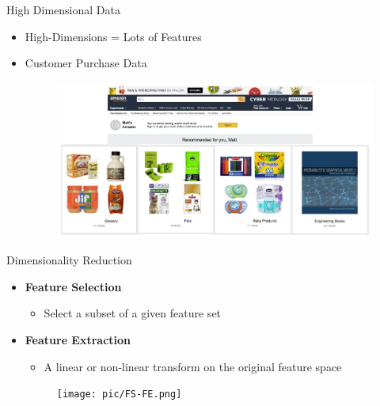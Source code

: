 \documentclass[serif, aspectratio=169]{beamer}
\begin{document}
\begin{frame}{High Dimensional Data}
    \begin{itemize}
        \item High-Dimensions  = Lots of	Features
        \item Customer Purchase Data
        \begin{figure}[htpb]
            \begin{center}
                \includegraphics[keepaspectratio, scale=0.4]{pic/customer_data.JPG}
            \end{center}
        \end{figure}
    \end{itemize}
\end{frame}


\begin{frame}{Dimensionality Reduction }
    \begin{itemize}
        \item \textbf{Feature Selection}
            \begin{itemize}
                \item Select a subset of a given feature set
            \end{itemize}

         \item \textbf{Feature Extraction}
            \begin{itemize}
                \item A linear or non-linear transform on the original feature space
            \end{itemize}
            \begin{figure}[htpb]
                \begin{center}
                    \texttt{[image: pic/FS-FE.png]}
                \end{center}
            \end{figure}
    \end{itemize}
\end{frame}
\end{document}
